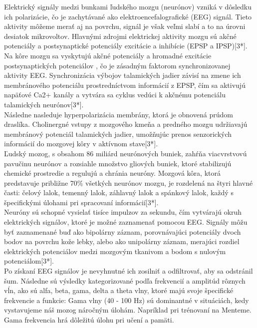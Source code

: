 \tab[5 mm] Elektrický signály medzi bunkami ľudského mozgu (neurónov) vzniká v dôsledku ich polarizácie, čo je zachytávané ako elektroencefalografické (EEG) signál. Tieto aktivity môžeme merať aj na povrchu, signál je však veľmi slabí a to na úrovni desiatok mikrovoltov. Hlavnými zdrojmi elektrickej aktivity mozgu sú akčné potenciály a postsynaptické potenciály excitácie a inhibície (EPSP a IPSP)[3*].\\
\tab[5 mm] Na kôre mozgu sa vyskytujú akčné potenciály a hromadné excitácie postsynaptických potenciálov , čo je zásadným faktorom synchronizovanej aktivity EEG. Synchronizácia výbojov talamických jadier závisí na zmene ich membránového potenciálu prostredníctvom informácií z EPSP, čím sa aktivujú napäťové Ca2+ kanály a vytvára sa cyklus vedúci k akčnému potenciálu talamických neurónov[3*].\\
\tab[5 mm] Následne nasleduje hyperpolarizácia membrány, ktorá je obnovená prúdom draslíka. Cholinergné vstupy z mozgového kmeňa a predného mozgu udržiavajú membránový potenciál talamických jadier, umožňujúc prenos senzorických informácií do mozgovej kôry v aktívnom stave[3*].\\
\tab[5 mm] Ľudský mozog, s obsahom 86 miliárd neurónových buniek, zahŕňa viacvrstvovú pavučinu neurónov a rozsiahle množstvo gliových buniek, ktoré stabilizujú chemické prostredie a regulujú a chránia neuróny. Mozgová kôra, ktorá predstavuje približne 70\% všetkých neurónov mozgu, je rozdelená na štyri hlavné časti: čelový lalok, temenný lalok, záhlavný lalok a spánkový lalok, každý s špecifickými úlohami pri spracovaní informácií[3*].\\
\tab[5 mm] Neuróny sú schopné vysielať tisíce impulzov za sekundu, čím vytvárajú okruh elektrických signálov, ktoré je možné zaznamenať pomocou EEG. Signály môžu byť zaznamenané buď ako bipolárny záznam, porovnávajúci potenciály dvoch bodov na povrchu kože lebky, alebo ako unipolárny záznam, merajúci rozdiel elektrických potenciálov medzi mozgovým tkanivom a bodom s nulovým potenciálom[3*].\\
\tab[5 mm] Po získaní EEG signálov je nevyhnutné ich zosilniť a odfiltrovať, aby sa odstránil šum. Následne sú výsledky kategorizované podľa frekvencií a amplitúd rôznych vĺn, ako sú alfa, beta, gama, delta a theta vlny, ktoré majú svoje špecifické frekvencie  a funkcie:
\tab[5 mm] Gama vlny (40 - 100 Hz) sú dominantné v situáciách, kedy vystavujeme náš mozog náročným úlohám. Napríklad pri trénovaní na Menteme. Gama frekvencia hrá dôležitú úlohu pri učení a pamäti.\\

